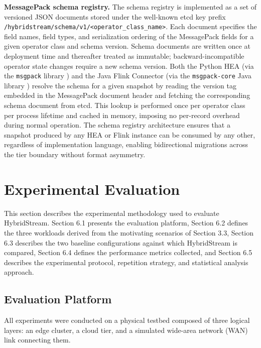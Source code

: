 \documentclass[preprint,review,12pt]{elsarticle}
\begin{document}
\textbf{MessagePack schema registry.} The schema registry is implemented as a set of versioned JSON documents stored under the well-known etcd key prefix \texttt{/hybridstream/schema/v1/<operator\_class\_name>}. Each document specifies the field names, field types, and serialization ordering of the MessagePack fields for a given operator class and schema version. Schema documents are written once at deployment time and thereafter treated as immutable; backward-incompatible operator state changes require a new schema version. Both the Python HEA (via the \texttt{msgpack} library \cite{msgpack_python2024}) and the Java Flink Connector (via the \texttt{msgpack-core} Java library \cite{msgpack_java2024}) resolve the schema for a given snapshot by reading the version tag embedded in the MessagePack document header and fetching the corresponding schema document from etcd. This lookup is performed once per operator class per process lifetime and cached in memory, imposing no per-record overhead during normal operation. The schema registry architecture ensures that a snapshot produced by any HEA or Flink instance can be consumed by any other, regardless of implementation language, enabling bidirectional migrations across the tier boundary without format asymmetry.



\section{Experimental Evaluation}\label{experimental-evaluation}

This section describes the experimental methodology used to evaluate HybridStream. Section 6.1 presents the evaluation platform, Section 6.2 defines the three workloads derived from the motivating scenarios of Section 3.3, Section 6.3 describes the two baseline configurations against which HybridStream is compared, Section 6.4 defines the performance metrics collected, and Section 6.5 describes the experimental protocol, repetition strategy, and statistical analysis approach.

\subsection{Evaluation Platform}\label{evaluation-platform}

All experiments were conducted on a physical testbed composed of three logical layers: an edge cluster, a cloud tier, and a simulated wide-area network (WAN) link connecting them.
\end{document}
